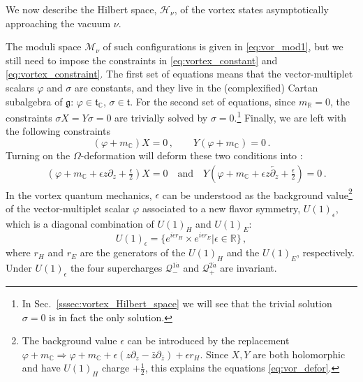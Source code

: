 \documentclass[12pt,a4paper]{article}
\renewcommand{\(}{\left(}
\renewcommand{\)}{\right)}
\newcommand{\eps}{\epsilon}
\renewcommand{\(}{\left(}
\renewcommand{\)}{\right)}
\begin{document}
We now describe the Hilbert space, $\mathcal{H}_\nu$, of the vortex states asymptotically approaching the vacuum $\nu$. 


The moduli space $\mathcal{M}_\nu$ of such configurations is given in \eqref{eq:vor_mod1}, but we still need to impose the constraints in \eqref{eq:vortex_constant} and \eqref{eq:vortex_constraint}. 
The first set of equations means that 
the vector-multiplet scalars $\varphi$ and $\sigma$ are constants, and they live in the (complexified) Cartan subalgebra of $\mathfrak{g}$:
$\varphi\in \mathfrak{t}_{\mathbb{C}}$, $\sigma \in \mathfrak{t}$.
For the second set of equations, since $m_{\mathbb{R}}=0$, the constraints $\sigma X=Y\sigma=0$ are trivially solved by $\sigma=0$.\footnote{In Sec.~\ref{sssec:vortex_Hilbert_space} we will see that the trivial solution $\sigma=0$ is in fact the only solution.}
Finally, we are left with the following constraints
\begin{equation}\label{eq:vor_non_defor}
(\varphi+m_{\mathbb{C}}) X=0\,,\qquad Y(\varphi+m_{\mathbb{C}}) =0\,.
\end{equation}
Turning on the $\Omega$-deformation will deform these two conditions into \cite{Bullimore:2018gva}:
\begin{equation}\label{eq:vor_defor}
\begin{aligned}
\
&(\varphi+m_{\mathbb{C}}+\epsilon z\partial_z+\frac{\eps}{2})X=0
\quad \textrm{and} \quad
Y(\varphi+m_{\mathbb{C}}+\epsilon z\overleftarrow{\partial_z}+\frac{\eps}{2})=0\,.
\end{aligned}
\end{equation}
In the vortex quantum mechanics, $\epsilon$ can be understood as the background value\footnote{The background value $\epsilon$ can be introduced by the replacement
$\varphi+m_{\mathbb{C}}\Longrightarrow \varphi+m_{\mathbb{C}}+\epsilon (z\partial_z-\bar{z}\partial_{\bar{z}})+\epsilon r_H$.
Since $X,Y$ are both holomorphic and have $U(1)_H$ charge $+\frac{1}{2}$, this explains the equations \eqref{eq:vor_defor}.} of the vector-multiplet scalar $\varphi$ associated to a new flavor symmetry, $U(1)_\epsilon$, which is a diagonal combination of $U(1)_H$ and $U(1)_E$:
\begin{equation}
U(1)_\epsilon=\{e^{i\epsilon r_H} \times e^{i\epsilon r_E}|\epsilon\in\mathbb{R}\}\,,
\end{equation}
where $r_H$ and $r_E$ are the generators of the  $U(1)_H$ and the $U(1)_E$, respectively. 
Under $U(1)_\eps$ the four supercharges $\mathcal{Q}^{1\dot{a}}_-$ and $\mathcal{Q}^{2\dot{a}}_+$ are invariant.
\end{document}
